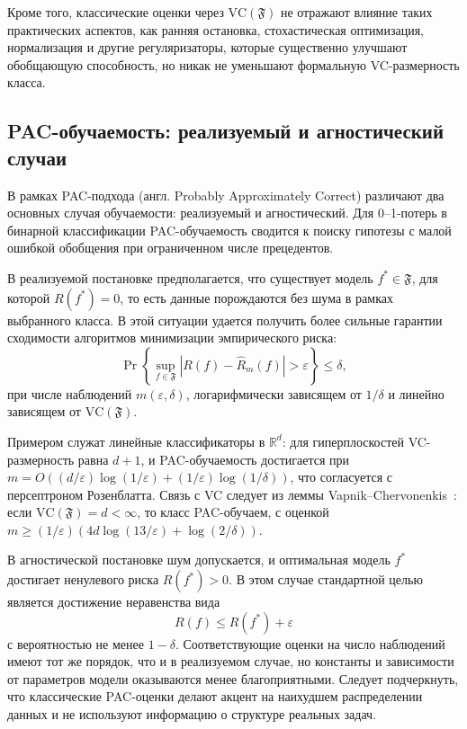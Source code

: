 Кроме того, классические оценки через $\mathrm{VC}(\mathfrak{F})$ не отражают влияние таких практических аспектов, как ранняя остановка, стохастическая оптимизация, нормализация и другие регуляризаторы, которые существенно улучшают обобщающую способность, но никак не уменьшают формальную VC-размерность класса.

\subsection{PAC-обучаемость: реализуемый и агностический случаи}

В рамках PAC-подхода (англ. Probably Approximately Correct) различают два основных случая обучаемости: реализуемый и агностический. Для 0--1-потерь в бинарной классификации PAC-обучаемость сводится к поиску гипотезы с малой ошибкой обобщения при ограниченном числе прецедентов.

В реализуемой постановке предполагается, что существует модель $f^{*} \in \mathfrak{F}$, для которой $R(f^{*}) = 0$, то есть данные порождаются без шума в рамках выбранного класса. В этой ситуации удается получить более сильные гарантии сходимости алгоритмов минимизации эмпирического риска:
\[
    \Pr\left\{\sup_{f \in \mathfrak{F}} |R(f) - \hat{R}_m(f)| > \varepsilon \right\} \leq \delta,
\]
при числе наблюдений $m(\varepsilon,\delta)$, логарифмически зависящем от $1/\delta$ и линейно зависящем от $\mathrm{VC}(\mathfrak{F})$.

Примером служат линейные классификаторы в $\mathbb{R}^d$: для гиперплоскостей VC-размерность равна $d+1$, и PAC-обучаемость достигается при $m = O((d/\varepsilon) \log(1/\varepsilon) + (1/\varepsilon) \log(1/\delta))$, что согласуется с персептроном Розенблатта. Связь с VC следует из леммы Vapnik--Chervonenkis~\cite[глава~5, теорема~5.1]{vapnik1974StatTheory}: если $\mathrm{VC}(\mathfrak{F}) = d < \infty$, то класс PAC-обучаем, с оценкой $m \geq (1/\varepsilon)(4d \log(13/\varepsilon) + \log(2/\delta))$.

В агностической постановке шум допускается, и оптимальная модель $f^{*}$ достигает ненулевого риска $R(f^{*}) > 0$. В этом случае стандартной целью является достижение неравенства вида
\[
    R(f) \leq R(f^{*}) + \varepsilon
\]
с вероятностью не менее $1 - \delta$. Соответствующие оценки на число наблюдений имеют тот же порядок, что и в реализуемом случае, но константы и зависимости от параметров модели оказываются менее благоприятными. Следует подчеркнуть, что классические PAC-оценки делают акцент на наихудшем распределении данных и не используют информацию о структуре реальных задач.

